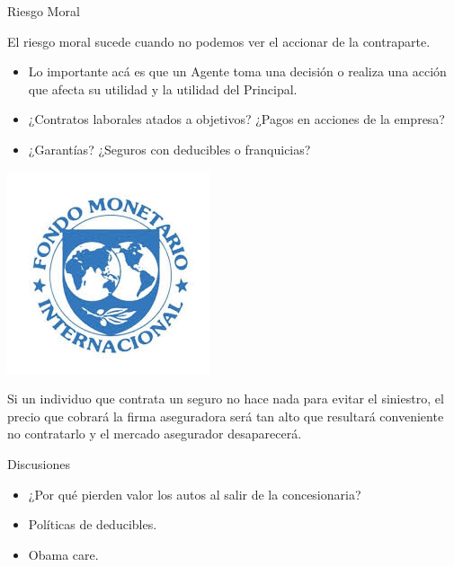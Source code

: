 \documentclass{beamer}
\begin{document}
\begin{frame}{Riesgo Moral}
    \begin{boxA}
        \centering
        El riesgo moral sucede cuando no podemos ver el accionar de la contraparte.
    \end{boxA}
    \begin{itemize}
        \item Lo importante acá es que un Agente toma una decisión o realiza una acción que afecta su
        utilidad y la utilidad del Principal.
        \item ¿Contratos laborales atados a objetivos? ¿Pagos en acciones de la empresa?
        \item ¿Garantías? ¿Seguros con deducibles o franquicias?
    \end{itemize}
    \centering
    \includegraphics[scale=0.4]{../Figures/FMI_Riesgo_Moral.jpg}
\end{frame}

\begin{frame}
    \begin{boxA}
        \centering
        Si un individuo que contrata un seguro no hace nada para evitar el
        siniestro, el precio que cobrará la firma aseguradora será tan alto
        que resultará conveniente no contratarlo y el mercado asegurador
        desaparecerá.
    \end{boxA}
\end{frame}

\begin{frame}{Discusiones}
    \begin{itemize}
        \item ¿Por qué pierden valor los autos al salir de la concesionaria?
        \item Políticas de deducibles.
        \item Obama care.
    \end{itemize}
\end{frame}
\end{document}
